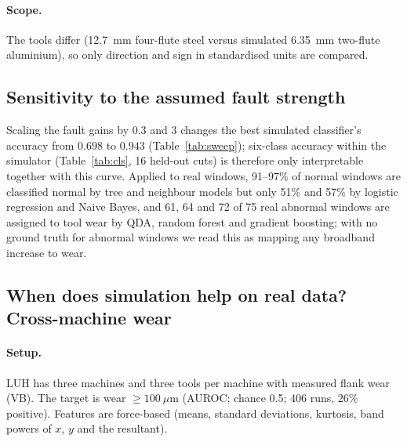 \documentclass[11pt]{article}
\begin{document}
\paragraph{Scope.} The tools differ (12.7~mm four-flute steel versus simulated 6.35~mm two-flute aluminium), so only direction and sign in standardised units are compared.

\subsection{Sensitivity to the assumed fault strength}\label{sec:sweep}
Scaling the fault gains by $0.3$ and $3$ changes the best simulated classifier's accuracy from $0.698$ to $0.943$ (Table~\ref{tab:sweep}); six-class accuracy within the simulator (Table~\ref{tab:cls}, 16 held-out cuts) is therefore only interpretable together with this curve. Applied to real windows, 91--97\% of normal windows are classified normal by tree and neighbour models but only 51\% and 57\% by logistic regression and Naive Bayes, and 61, 64 and 72 of 75 real abnormal windows are assigned to tool wear by QDA, random forest and gradient boosting; with no ground truth for abnormal windows we read this as mapping any broadband increase to wear.
\begin{table}[t]\centering\small
\caption{Top-1 accuracy of classifiers on simulated data versus fault gain relative to the calibrated value.}\label{tab:sweep}

\end{table}
\begin{table}[t]\centering\small
\caption{Six-class classification on simulated data, 16 held-out cuts (chance $0.167$).}\label{tab:cls}

\end{table}

\subsection{When does simulation help on real data? Cross-machine wear}\label{sec:wear}
\paragraph{Setup.} LUH has three machines and three tools per machine with measured flank wear (VB). The target is wear $\ge100~\mu$m (AUROC; chance 0.5; 406 runs, 26\% positive). Features are force-based (means, standard deviations, kurtosis, band powers of $x$, $y$ and the resultant).
\end{document}
